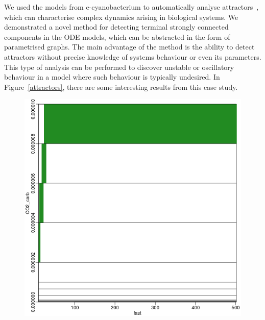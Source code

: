 \documentclass[11pt,a4paper]{report}
\begin{document}
We used the models from e-cyanobacterium to automatically analyse attractors~\cite{benevs2018fully}, which can characterise complex dynamics arising in biological systems. We demonstrated a novel method for detecting terminal strongly connected components in the ODE models, which can be abstracted in the form of parametrised graphs. The main advantage of the method is the ability to detect attractors without precise knowledge of systems behaviour or even its parameters. This type of analysis can be performed to discover unstable or oscillatory behaviour in a model where such behaviour is typically undesired. In Figure~\ref{attractors}, there are some interesting results from this case study. 

\begin{figure}[!h]
\begin{minipage}{0.45\textwidth}
\begin{center}
\includegraphics[scale=0.3]{images/clark_fast_vs_co2.png}
\end{center}
\end{minipage}
\hfill
\begin{minipage}{0.45\textwidth}
\begin{center}

\end{center}
\end{minipage}
\end{figure}
\end{document}

